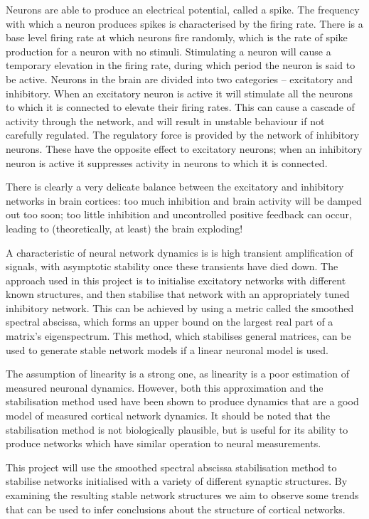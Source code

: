 \documentclass[12pt, a4paper]{article}
\begin{document}
Neurons are able to produce an electrical potential, called a spike.  The frequency with which a neuron produces spikes is characterised by the firing rate.  There is a base level firing rate at which neurons fire randomly, which is the rate of spike production for a neuron with no stimuli.  Stimulating a neuron will cause a temporary elevation in the firing rate, during which period the neuron is said to be active.  Neurons in the brain are divided into two categories -- excitatory and inhibitory.  When an excitatory neuron is active it will stimulate all the neurons to which it is connected to elevate their firing rates.  This can cause a cascade of activity through the network, and will result in unstable behaviour if not carefully regulated.  The regulatory force is provided by the network of inhibitory neurons.  These have the opposite effect to excitatory neurons; when an inhibitory neuron is active it suppresses activity in neurons to which it is connected.

There is clearly a very delicate balance between the excitatory and inhibitory networks in brain cortices: too much inhibition and brain activity will be damped out too soon; too little inhibition and uncontrolled positive feedback can occur, leading to (theoretically, at least) the brain exploding!  

A characteristic of neural network dynamics is is high transient amplification of signals, with asymptotic stability once these transients have died down.  The approach used in this project is to initialise excitatory networks with different known structures, and then stabilise that network with an appropriately tuned inhibitory network.  This can be achieved by using a metric called the smoothed spectral abscissa, which forms an upper bound on the largest real part of a matrix's eigenspectrum.  This method, which stabilises general matrices, can be used to generate stable network models if a linear neuronal model is used.  

The assumption of linearity is a strong one, as linearity is a poor estimation of measured neuronal dynamics.  However, both this approximation and the stabilisation method used have been shown to produce dynamics that are a good model of measured cortical network dynamics\cite{HennequinSubmitted}.  It should be noted that the stabilisation method is not biologically plausible, but is useful for its ability to produce networks which have similar operation to neural measurements.  

This project will use the smoothed spectral abscissa stabilisation method to stabilise networks initialised with a variety of different synaptic structures.  By examining the resulting stable network structures we aim to observe some trends that can be used to infer conclusions about the structure of cortical networks.
\end{document}

